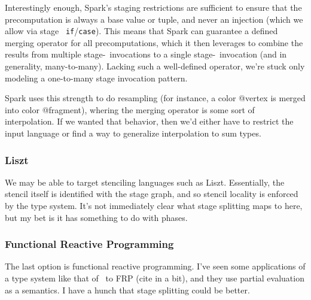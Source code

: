 Interestingly enough, Spark's staging restrictions are sufficient to ensure 
that the precomputation is always a base value or tuple, and never an injection 
(which we allow via stage \bbone\ {\tt if}/{\tt case}).
This means that Spark can guarantee a defined merging operator for all precomputations, 
which it then leverages to combine the results from multiple stage-\bbone\ invocations to a single stage-\bbtwo\ invocation
(and in generality, many-to-many).
Lacking such a well-defined operator, we're stuck only modeling a one-to-many stage invocation pattern.

Spark uses this strength to do resampling (for instance, a color @vertex is merged into color @fragment), 
whering the merging operator is some sort of interpolation.  
If we wanted that behavior, then we'd either have to restrict the input language
or find a way to generalize interpolation to sum types.

\subsubsection{Liszt}

We may be able to target stenciling languages such as Liszt.  
Essentially, the stencil itself is identified with the stage graph, 
and so stencil locality is enforced by the type system.
It's not immediately clear what stage splitting maps to here, but my bet is it has something to do with phases.


\subsubsection{Functional Reactive Programming}

The last option is functional reactive programming.
I've seen some applications of a type system like that of \lang\ to FRP (cite in a bit),
and they use partial evaluation as a semantics.
I have a hunch that stage splitting could be better.
